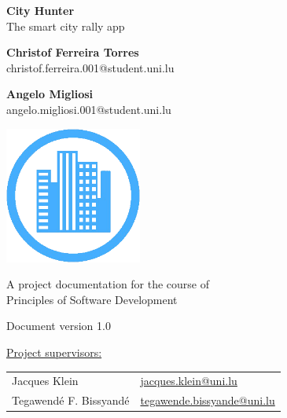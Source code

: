 
\setcounter{page}{1}

\newpage

\thispagestyle{empty}
\begin{center}
  {\Huge \bf City Hunter \\}
  {\huge The smart city rally app}

  \vspace{5ex}
  {\large\bf Christof Ferreira Torres}\\
  {christof.ferreira.001@student.uni.lu}
 
  \vspace*{0.5cm}
  
  {\large\bf Angelo Migliosi}\\
  {angelo.migliosi.001@student.uni.lu}

   \vspace*{1.5cm}

   \begin{center}
   \includegraphics[width=4.5cm, keepaspectratio=true]{logo-CH}
   \end{center}

  \vspace*{1.5cm}

  {\large A project documentation for the course of\\
              Principles of Software Development}
  
  \vspace*{0.5cm}
  
  {\large Document version 1.0}

  \vspace*{1.5cm}

  \underline{Project supervisors:} \\
  
  \vspace*{0.5cm}
  
  {\small
  \begin{tabular}{ll}
  Jacques Klein & \url{jacques.klein@uni.lu} \\
  Tegawend\'e F. Bissyand\'e & \url{tegawende.bissyande@uni.lu} \\
  \end{tabular}
  }
  

\end{center}
